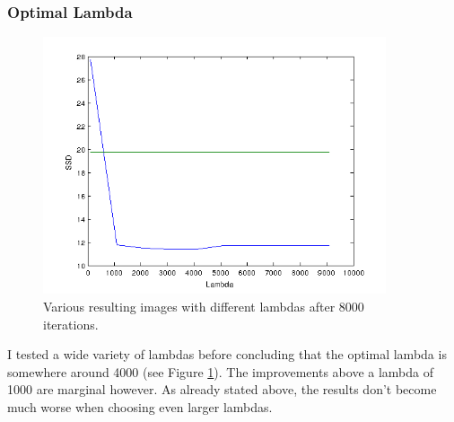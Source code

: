 \documentclass{paper}
\begin{document}
\subsubsection*{Optimal Lambda}
\begin{figure}[ht!]%
\centering
\includegraphics[width=0.9\textwidth]{lambda_vs_ssd.png}
\caption{Various resulting images with different lambdas after 8000 iterations.}
\label{fig:lambda_vs_ssd}
\end{figure}
I tested a wide variety of lambdas before concluding that the optimal lambda
is somewhere around 4000 (see Figure \ref{fig:lambda_vs_ssd}). The improvements above a lambda
of 1000 are marginal however. As already stated above, the results don't become
much worse when choosing even larger lambdas.
\end{document}
